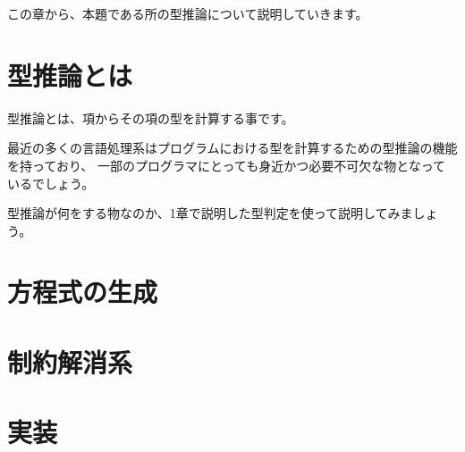 
この章から、本題である所の型推論について説明していきます。

\section{型推論とは}

型推論とは、項からその項の型を計算する事です。

最近の多くの言語処理系はプログラムにおける型を計算するための型推論の機能を持っており、
一部のプログラマにとっても身近かつ必要不可欠な物となっているでしょう。

型推論が何をする物なのか、1章で説明した型判定を使って説明してみましょう。



\section{方程式の生成}



\section{制約解消系}



\section{実装}



